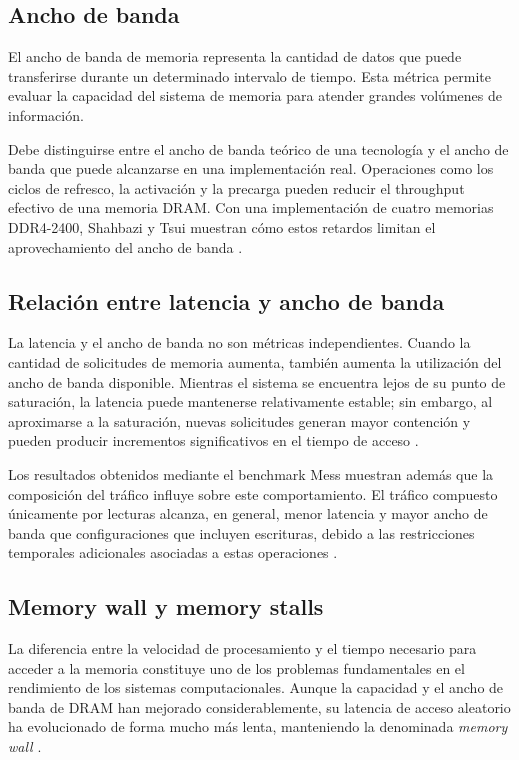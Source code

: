 \subsection{Ancho de banda}

El ancho de banda de memoria representa la cantidad de datos que puede
transferirse durante un determinado intervalo de tiempo. Esta métrica permite
evaluar la capacidad del sistema de memoria para atender grandes volúmenes de
información.

Debe distinguirse entre el ancho de banda teórico de una tecnología y el
ancho de banda que puede alcanzarse en una implementación real. Operaciones
como los ciclos de refresco, la activación y la precarga pueden reducir el
throughput efectivo de una memoria DRAM. Con una implementación de cuatro memorias
DDR4-2400, Shahbazi y Tsui muestran cómo estos retardos limitan el aprovechamiento 
del ancho de banda \cite{shahbazi2026ddr4}. 

\subsection{Relación entre latencia y ancho de banda}

La latencia y el ancho de banda no son métricas independientes. Cuando la
cantidad de solicitudes de memoria aumenta, también aumenta la utilización
del ancho de banda disponible. Mientras el sistema se encuentra lejos de su
punto de saturación, la latencia puede mantenerse relativamente estable; sin
embargo, al aproximarse a la saturación, nuevas solicitudes generan mayor
contención y pueden producir incrementos significativos en el tiempo de
acceso \cite{esmailidokht2024mess}.

Los resultados obtenidos mediante el benchmark Mess muestran además que la
composición del tráfico influye sobre este comportamiento. El tráfico
compuesto únicamente por lecturas alcanza, en general, menor latencia y mayor
ancho de banda que configuraciones que incluyen escrituras, debido a las
restricciones temporales adicionales asociadas a estas operaciones
\cite{esmailidokht2024mess}.

\subsection{Memory wall y memory stalls}

La diferencia entre la velocidad de procesamiento y el tiempo necesario para
acceder a la memoria constituye uno de los problemas fundamentales en el
rendimiento de los sistemas computacionales. Aunque la capacidad y el ancho
de banda de DRAM han mejorado considerablemente, su latencia de acceso
aleatorio ha evolucionado de forma mucho más lenta, manteniendo la denominada
\textit{memory wall} \cite{son2013reducing}.

